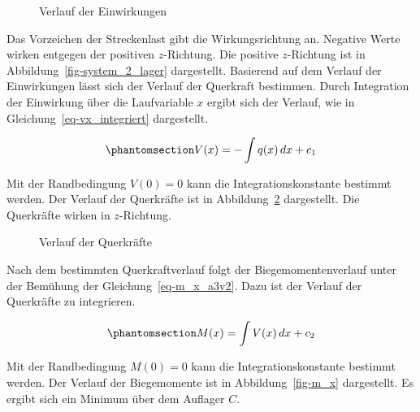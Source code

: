 \documentclass[
  12pt,
  letterpaper,
  egregdoesnotlikesansseriftitles]{scrreprt}
\begin{document}
\begin{figure}[H]


\caption{\label{fig-q_x}Verlauf der Einwirkungen}

\end{figure}%

Das Vorzeichen der Streckenlast gibt die Wirkungsrichtung an. Negative
Werte wirken entgegen der positiven \(z\)-Richtung. Die positive
\(z\)-Richtung ist in Abbildung~\ref{fig-system_2_lager} dargestellt.
Basierend auf dem Verlauf der Einwirkungen lässt sich der Verlauf der
Querkraft bestimmen. Durch Integration der Einwirkung über die
Laufvariable \(x\) ergibt sich der Verlauf, wie in
Gleichung~\ref{eq-vx_integriert} dargestellt.

\begin{equation}\phantomsection\label{eq-vx_integriert}{
V(x) = -\int q(x) \, dx + c_1
}\end{equation}

Mit der Randbedingung \(V(0) = 0\) kann die Integrationskonstante
bestimmt werden. Der Verlauf der Querkräfte ist in
Abbildung~\ref{fig-v_x} dargestellt. Die Querkräfte wirken in
\(z\)-Richtung.

\begin{figure}[H]


\caption{\label{fig-v_x}Verlauf der Querkräfte}

\end{figure}%

Nach dem bestimmten Querkraftverlauf folgt der Biegemomentenverlauf
unter der Bemühung der Gleichung~\ref{eq-m_x_a3v2}. Dazu ist der Verlauf
der Querkräfte zu integrieren.

\begin{equation}\phantomsection\label{eq-m_x_a3v2}{
M(x) = \int V(x) \, dx + c_2
}\end{equation}

Mit der Randbedingung \(M(0) = 0\) kann die Integrationskonstante
bestimmt werden. Der Verlauf der Biegemomente ist in
Abbildung~\ref{fig-m_x} dargestellt. Es ergibt sich ein Minimum über dem
Auflager \(C\).
\end{document}
